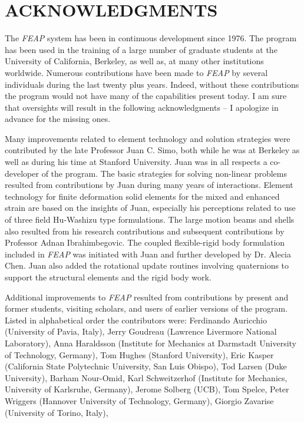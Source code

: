 \chapter[Acknowledgments]{ACKNOWLEDGMENTS}
\label{ackn}

The {\sl FEAP} system has been in continuous development since 1976.  The
program has been used in the training of a large number of graduate students at
the University of California, Berkeley, as well as, at many other 
institutions worldwide.  Numerous contributions have been made to {\sl FEAP}
by several individuals during the last twenty plus years.  Indeed, without these
contributions the program would not have many of the capabilities present today.  
I am sure that oversights will result in the following acknowledgments --
I apologize in advance for the missing ones.

Many improvements
related to element technology and solution strategies were contributed by
the late Professor Juan C. Simo, both while he was at Berkeley as well as
during his time at Stanford University.
Juan was in all respects a co-developer of the program.
The basic strategies for solving
non-linear problems resulted from contributions by Juan during many
years of interactions.  Element technology for finite deformation solid
elements for the mixed and enhanced strain are based on the insights of Juan,
especially his perceptions related to use of three field Hu-Washizu
type formulations.  The large motion beams and shells also resulted
from his research contributions and subsequent contributions by Professor
Adnan Ibrahimbegovic.  The coupled flexible-rigid
body formulation included in {\sl FEAP} was initiated with Juan and further
developed by Dr. Alecia Chen.
Juan also added the rotational update routines involving quaternions
to support the structural elements and the rigid body work.

Additional improvements to {\sl FEAP} resulted from 
contributions by present and former students, visiting scholars,
and users of earlier
versions of the program.  Listed in alphabetical order the contributors were:
Ferdinando Auricchio (University of Pavia, Italy),
Jerry Goudreau (Lawrence Livermore National Laboratory),
Anna Haraldsson (Institute for Mechanics at Darmstadt University of
Technology, Germany),
Tom Hughes (Stanford University),
Eric Kasper (California State Polytechnic University, San Luis Obispo),
Tod Larsen (Duke University),
Barham Nour-Omid,
Karl Schweitzerhof (Institute for Mechanics, University of Karlsruhe, Germany),
Jerome Solberg (UCB),
Tom Spelce,
Peter Wriggers (Hannover University of Technology, Germany),
Giorgio Zavarise (University of Torino, Italy),

